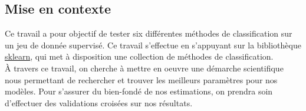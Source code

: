\subsection{Mise en contexte}

Ce travail a pour objectif de tester six différentes méthodes de classification sur un jeu de donnée supervisé. Ce travail s'effectue en s'appuyant sur la bibliothèque \href{https://scikit-learn.org/stable/supervised_learning.html}{sklearn}, qui met à disposition une collection de méthodes de classification.\\

À travers ce travail, on cherche à mettre en oeuvre une démarche scientifique nous permettant de rechercher et trouver les meilleurs paramètres pour nos modèles. Pour s'assurer du bien-fondé de nos estimations, on prendra soin d'effectuer des validations croisées sur nos résultats. 
